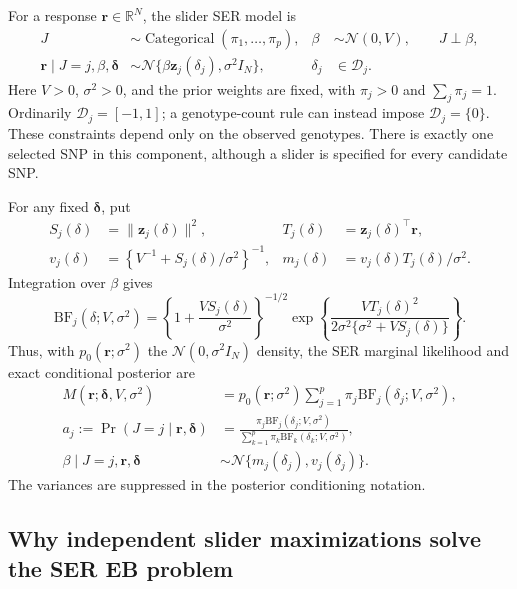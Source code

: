 \documentclass[11pt]{article}
\newcommand{\Normal}{\mathcal{N}}
\newcommand{\BF}{\mathrm{BF}}
\begin{document}
For a response $\mathbf r\in\mathbb R^N$, the slider SER model is
\begin{align}
J&\sim\operatorname{Categorical}(\pi_1,\ldots,\pi_p),
 &\beta&\sim\Normal(0,V),\qquad J\perp\beta,\nonumber\\
\mathbf r\mid J=j,\beta,\boldsymbol\delta
 &\sim\Normal\{\beta\mathbf z_j(\delta_j),\sigma^2 I_N\},
 &\delta_j&\in\mathcal D_j.
\label{eq:veb-ser-model}
\end{align}
Here $V>0$, $\sigma^2>0$, and the prior weights are fixed, with
$\pi_j>0$ and $\sum_j\pi_j=1$. Ordinarily
$\mathcal D_j=[-1,1]$; a genotype-count rule can instead impose
$\mathcal D_j=\{0\}$. These constraints depend only on the observed
genotypes. There is exactly one selected SNP in this component,
although a slider is specified for every candidate SNP.

For any fixed $\boldsymbol\delta$, put
\begin{align}
S_j(\delta)&=\|\mathbf z_j(\delta)\|^2,
 &T_j(\delta)&=\mathbf z_j(\delta)^\top\mathbf r,\nonumber\\
v_j(\delta)&=\left\{V^{-1}+S_j(\delta)/\sigma^2\right\}^{-1},
 &m_j(\delta)&=v_j(\delta)T_j(\delta)/\sigma^2.
\label{eq:veb-ser-moments}
\end{align}
Integration over $\beta$ gives
\begin{equation}
\BF_j(\delta;V,\sigma^2)
 =\left\{1+\frac{VS_j(\delta)}{\sigma^2}\right\}^{-1/2}
 \exp\left\{\frac{VT_j(\delta)^2}
 {2\sigma^2\{\sigma^2+VS_j(\delta)\}}\right\}.
\label{eq:veb-ser-bf}
\end{equation}
Thus, with $p_0(\mathbf r;\sigma^2)$ the $\Normal(0,\sigma^2 I_N)$
density, the SER marginal likelihood and exact conditional posterior
are
\begin{align}
M(\mathbf r;\boldsymbol\delta,V,\sigma^2)
 &=p_0(\mathbf r;\sigma^2)
   \sum_{j=1}^p\pi_j\BF_j(\delta_j;V,\sigma^2),
\label{eq:veb-ser-evidence}\\
a_j:=\Pr(J=j\mid\mathbf r,\boldsymbol\delta)
 &=\frac{\pi_j\BF_j(\delta_j;V,\sigma^2)}
 {\sum_{k=1}^p\pi_k\BF_k(\delta_k;V,\sigma^2)},
\label{eq:veb-ser-weights}\\
\beta\mid J=j,\mathbf r,\boldsymbol\delta
 &\sim\Normal\{m_j(\delta_j),v_j(\delta_j)\}.
\label{eq:veb-ser-posterior}
\end{align}
The variances are suppressed in the posterior conditioning notation.

\subsection{Why independent slider maximizations solve the SER EB problem}
\end{document}
